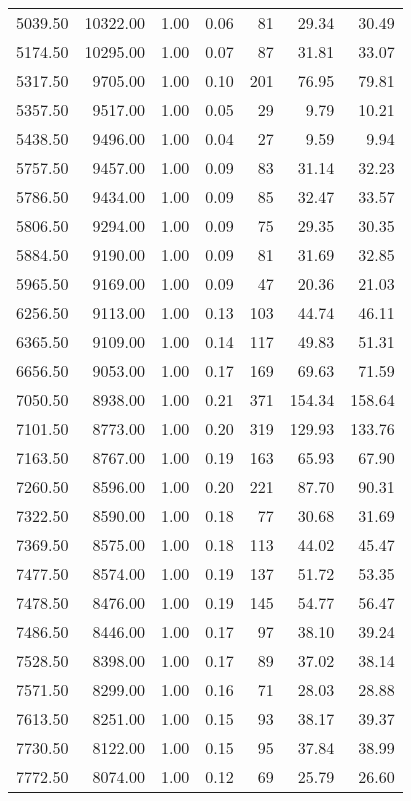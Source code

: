 \begin{table}
\begin{tabular}{rrrrrrr}
5039.50 & 10322.00 & 1.00 & 0.06 & 81 & 29.34 & 30.49 \\
5174.50 & 10295.00 & 1.00 & 0.07 & 87 & 31.81 & 33.07 \\
5317.50 & 9705.00 & 1.00 & 0.10 & 201 & 76.95 & 79.81 \\
5357.50 & 9517.00 & 1.00 & 0.05 & 29 & 9.79 & 10.21 \\
5438.50 & 9496.00 & 1.00 & 0.04 & 27 & 9.59 & 9.94 \\
5757.50 & 9457.00 & 1.00 & 0.09 & 83 & 31.14 & 32.23 \\
5786.50 & 9434.00 & 1.00 & 0.09 & 85 & 32.47 & 33.57 \\
5806.50 & 9294.00 & 1.00 & 0.09 & 75 & 29.35 & 30.35 \\
5884.50 & 9190.00 & 1.00 & 0.09 & 81 & 31.69 & 32.85 \\
5965.50 & 9169.00 & 1.00 & 0.09 & 47 & 20.36 & 21.03 \\
6256.50 & 9113.00 & 1.00 & 0.13 & 103 & 44.74 & 46.11 \\
6365.50 & 9109.00 & 1.00 & 0.14 & 117 & 49.83 & 51.31 \\
6656.50 & 9053.00 & 1.00 & 0.17 & 169 & 69.63 & 71.59 \\
7050.50 & 8938.00 & 1.00 & 0.21 & 371 & 154.34 & 158.64 \\
7101.50 & 8773.00 & 1.00 & 0.20 & 319 & 129.93 & 133.76 \\
7163.50 & 8767.00 & 1.00 & 0.19 & 163 & 65.93 & 67.90 \\
7260.50 & 8596.00 & 1.00 & 0.20 & 221 & 87.70 & 90.31 \\
7322.50 & 8590.00 & 1.00 & 0.18 & 77 & 30.68 & 31.69 \\
7369.50 & 8575.00 & 1.00 & 0.18 & 113 & 44.02 & 45.47 \\
7477.50 & 8574.00 & 1.00 & 0.19 & 137 & 51.72 & 53.35 \\
7478.50 & 8476.00 & 1.00 & 0.19 & 145 & 54.77 & 56.47 \\
7486.50 & 8446.00 & 1.00 & 0.17 & 97 & 38.10 & 39.24 \\
7528.50 & 8398.00 & 1.00 & 0.17 & 89 & 37.02 & 38.14 \\
7571.50 & 8299.00 & 1.00 & 0.16 & 71 & 28.03 & 28.88 \\
7613.50 & 8251.00 & 1.00 & 0.15 & 93 & 38.17 & 39.37 \\
7730.50 & 8122.00 & 1.00 & 0.15 & 95 & 37.84 & 38.99 \\
7772.50 & 8074.00 & 1.00 & 0.12 & 69 & 25.79 & 26.60 \\

\end{tabular}
\end{table}
